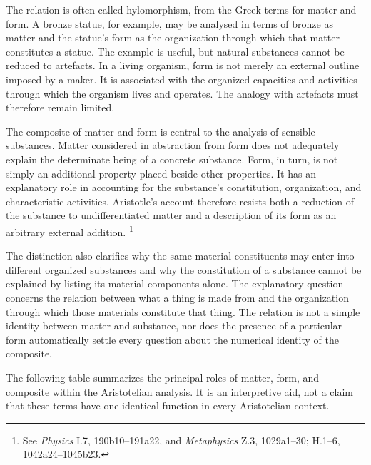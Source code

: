 \label{para:VS.B01.P01.C08.S05.SS05.P002}

The relation is often called hylomorphism, from the
Greek terms for matter and form. A bronze statue,
for example, may be analysed in terms of bronze
as matter and the statue's form as the organization
through which that matter constitutes a statue.
The example is useful, but natural substances cannot
be reduced to artefacts. In a living organism, form
is not merely an external outline imposed by a maker.
It is associated with the organized capacities and
activities through which the organism lives and
operates. The analogy with artefacts must therefore
remain limited.

\label{para:VS.B01.P01.C08.S05.SS05.P003}

The composite of matter and form is central to the
analysis of sensible substances. Matter considered
in abstraction from form does not adequately explain
the determinate being of a concrete substance.
Form, in turn, is not simply an additional property
placed beside other properties. It has an explanatory
role in accounting for the substance's constitution,
organization, and characteristic activities.
Aristotle's account therefore resists both a reduction
of the substance to undifferentiated matter and a
description of its form as an arbitrary external
addition. \footnote{See \textit{Physics} I.7,
190b10--191a22, and \textit{Metaphysics} Z.3,
1029a1--30; H.1--6, 1042a24--1045b23.}

\label{para:VS.B01.P01.C08.S05.SS05.P004}

The distinction also clarifies why the same material
constituents may enter into different organized
substances and why the constitution of a substance
cannot be explained by listing its material components
alone. The explanatory question concerns the relation
between what a thing is made from and the organization
through which those materials constitute that thing.
The relation is not a simple identity between matter
and substance, nor does the presence of a particular
form automatically settle every question about the
numerical identity of the composite.

\label{para:VS.B01.P01.C08.S05.SS05.P005}

The following table summarizes the principal roles
of matter, form, and composite within the Aristotelian
analysis. It is an interpretive aid, not a claim that
these terms have one identical function in every
Aristotelian context.

